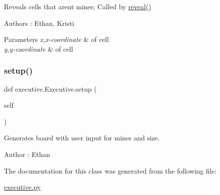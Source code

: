 Reveals cells that aren\textquotesingle{}t mines; Called by \mbox{\hyperlink{classexecutive_1_1_executive_a6c8b73fd28d41e64cbd8b259d3c92ae8}{reveal()}} 

\begin{DoxyAuthor}{Authors}
\+: Ethan, Kristi 
\end{DoxyAuthor}

\begin{DoxyParams}{Parameters}
{\em x,x-\/coordinate} & of cell \\
\hline
{\em y,y-\/coordinate} & of cell \\
\hline
\end{DoxyParams}
\mbox{\label{classexecutive_1_1_executive_a45fd19b240299b2f39e9c83d25c47d4a}} 
\subsubsection{\texorpdfstring{setup()}{setup()}}
{\footnotesize\ttfamily def executive.\+Executive.\+setup (\begin{DoxyParamCaption}\item[{}]{self }\end{DoxyParamCaption})}



Generates board with user input for mines and size. 

\begin{DoxyAuthor}{Author}
\+: Ethan 
\end{DoxyAuthor}


The documentation for this class was generated from the following file\+:\begin{DoxyCompactItemize}
\item 
\mbox{\hyperlink{executive_8py}{executive.\+py}}\end{DoxyCompactItemize}
